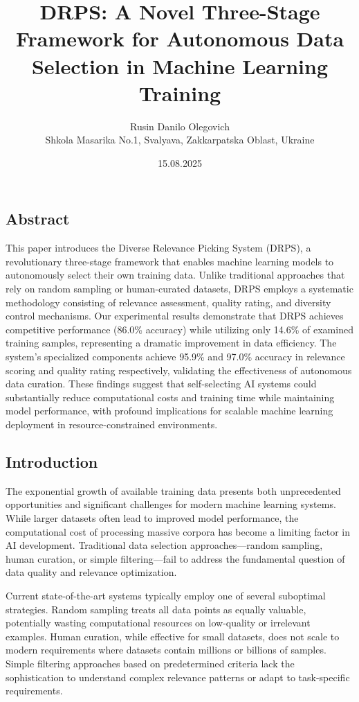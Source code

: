 \documentclass[12pt]{article}
\title{DRPS: A Novel Three-Stage Framework for Autonomous Data Selection in Machine Learning Training}
\author{Rusin Danilo Olegovich\\Shkola Masarika No.1, Svalyava, Zakkarpatska Oblast, Ukraine}
\date{15.08.2025}
\begin{document}
\maketitle

\subsection{Abstract}\label{abstract}

This paper introduces the Diverse Relevance Picking System (DRPS), a revolutionary three-stage framework that enables machine learning models to autonomously select their own training data. Unlike traditional approaches that rely on random sampling or human-curated datasets, DRPS employs a systematic methodology consisting of relevance assessment, quality rating, and diversity control mechanisms. Our experimental results demonstrate that DRPS achieves competitive performance (86.0\% accuracy) while utilizing only 14.6\% of examined training samples, representing a dramatic improvement in data efficiency. The system's specialized components achieve 95.9\% and 97.0\% accuracy in relevance scoring and quality rating respectively, validating the effectiveness of autonomous data curation. These findings suggest that self-selecting AI systems could substantially reduce computational costs and training time while maintaining model performance, with profound implications for scalable machine learning deployment in resource-constrained environments.

\subsection{Introduction}\label{introduction}

The exponential growth of available training data presents both unprecedented opportunities and significant challenges for modern machine learning systems. While larger datasets often lead to improved model performance, the computational cost of processing massive corpora has become a limiting factor in AI development. Traditional data selection approaches—random sampling, human curation, or simple filtering—fail to address the fundamental question of data quality and relevance optimization.

Current state-of-the-art systems typically employ one of several suboptimal strategies. Random sampling treats all data points as equally valuable, potentially wasting computational resources on low-quality or irrelevant examples. Human curation, while effective for small datasets, does not scale to modern requirements where datasets contain millions or billions of samples. Simple filtering approaches based on predetermined criteria lack the sophistication to understand complex relevance patterns or adapt to task-specific requirements.
\end{document}
